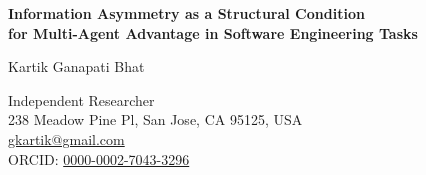 \documentclass[12pt]{article}
\begin{document}
\begin{center}
{\Large\bfseries Information Asymmetry as a Structural Condition\\
for Multi-Agent Advantage in Software Engineering Tasks}

\vspace{2em}

{\large Kartik Ganapati Bhat}

\vspace{1em}

Independent Researcher\\
238 Meadow Pine Pl, San Jose, CA 95125, USA\\
\href{mailto:gkartik@gmail.com}{gkartik@gmail.com}\\
ORCID: \href{https://orcid.org/0000-0002-7043-3296}{0000-0002-7043-3296}

\end{center}
\end{document}

